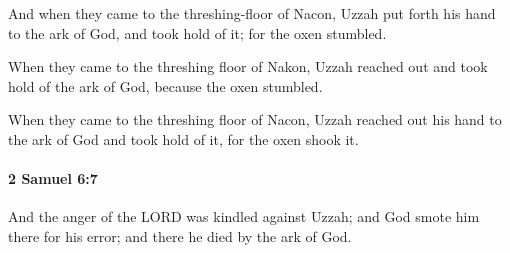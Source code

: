 			\begin{versebox}
					\item[BHS] 
					\item[ASV] And when they came to the threshing-floor of Nacon, Uzzah put forth his hand to the ark of God, and took hold of it; for the oxen stumbled.
					\item[NIV] When they came to the threshing floor of Nakon, Uzzah reached out and took hold of the ark of God, because the oxen stumbled.
					\item[NRSV] When they came to the threshing floor of Nacon, Uzzah reached out his hand to the ark of God and took hold of it, for the oxen shook it.
			\end{versebox}

		\paragraph{2 Samuel 6:7} %
			\label{2SAMUEL-6-7}

			And the anger of the LORD was kindled against Uzzah; and God smote him there for his error; and there he died by the ark of God.

